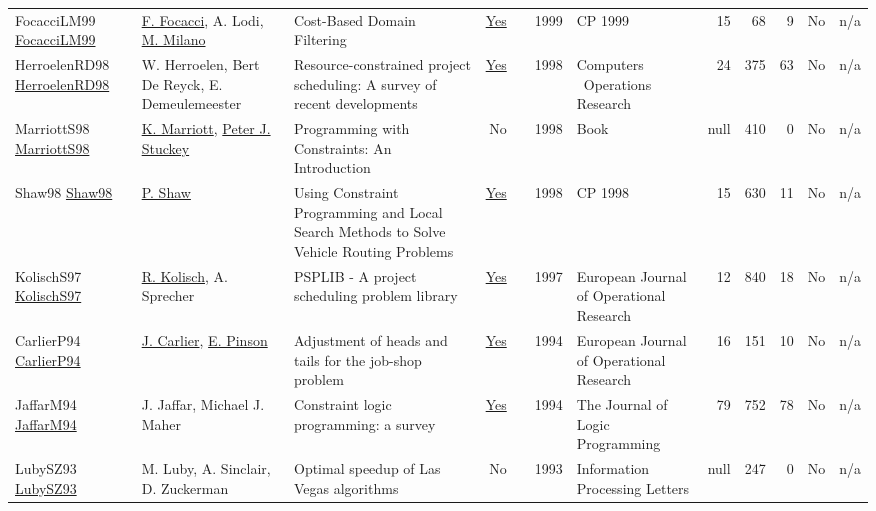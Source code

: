{\begin{longtable}{>{\raggedright\arraybackslash}p{3cm}>{\raggedright\arraybackslash}p{6cm}>{\raggedright\arraybackslash}p{6.5cm}rrrp{2.5cm}rrrrr}
FocacciLM99 \href{https://doi.org/10.1007/978-3-540-48085-3_14}{FocacciLM99} & \hyperref[auth:a779]{F. Focacci}, A. Lodi, \hyperref[auth:a144]{M. Milano} & Cost-Based Domain Filtering & \href{../works/FocacciLM99.pdf}{Yes} & \cite{FocacciLM99} & 1999 & CP 1999 & 15 & 68 & 9 & No & n/a\\
HerroelenRD98 \href{http://dx.doi.org/10.1016/s0305-0548(97)00055-5}{HerroelenRD98} & W. Herroelen, Bert De Reyck, E. Demeulemeester & Resource-constrained project scheduling: A survey of recent developments & \href{../works/HerroelenRD98.pdf}{Yes} & \cite{HerroelenRD98} & 1998 & Computers \  Operations Research & 24 & 375 & 63 & No & n/a\\
MarriottS98 \href{http://dx.doi.org/10.7551/mitpress/5625.001.0001}{MarriottS98} & \hyperref[auth:a691]{K. Marriott}, \hyperref[auth:a126]{Peter J. Stuckey} & Programming with Constraints: An Introduction & No & \cite{MarriottS98} & 1998 & Book & null & 410 & 0 & No & n/a\\
Shaw98 \href{https://doi.org/10.1007/3-540-49481-2_30}{Shaw98} & \hyperref[auth:a120]{P. Shaw} & Using Constraint Programming and Local Search Methods to Solve Vehicle Routing Problems & \href{../works/Shaw98.pdf}{Yes} & \cite{Shaw98} & 1998 & CP 1998 & 15 & 630 & 11 & No & n/a\\
KolischS97 \href{http://dx.doi.org/10.1016/s0377-2217(96)00170-1}{KolischS97} & \hyperref[auth:a443]{R. Kolisch}, A. Sprecher & PSPLIB - A project scheduling problem library & \href{../works/KolischS97.pdf}{Yes} & \cite{KolischS97} & 1997 & European Journal of Operational Research & 12 & 840 & 18 & No & n/a\\
CarlierP94 \href{http://dx.doi.org/10.1016/0377-2217(94)90379-4}{CarlierP94} & \hyperref[auth:a849]{J. Carlier}, \hyperref[auth:a850]{E. Pinson} & Adjustment of heads and tails for the job-shop problem & \href{../works/CarlierP94.pdf}{Yes} & \cite{CarlierP94} & 1994 & European Journal of Operational Research & 16 & 151 & 10 & No & n/a\\
JaffarM94 \href{http://dx.doi.org/10.1016/0743-1066(94)90033-7}{JaffarM94} & J. Jaffar, Michael J. Maher & Constraint logic programming: a survey & \href{../works/JaffarM94.pdf}{Yes} & \cite{JaffarM94} & 1994 & The Journal of Logic Programming & 79 & 752 & 78 & No & n/a\\
LubySZ93 \href{http://dx.doi.org/10.1016/0020-0190(93)90029-9}{LubySZ93} & M. Luby, A. Sinclair, D. Zuckerman & Optimal speedup of Las Vegas algorithms & No & \cite{LubySZ93} & 1993 & Information Processing Letters & null & 247 & 0 & No & n/a\\

\end{longtable}}
